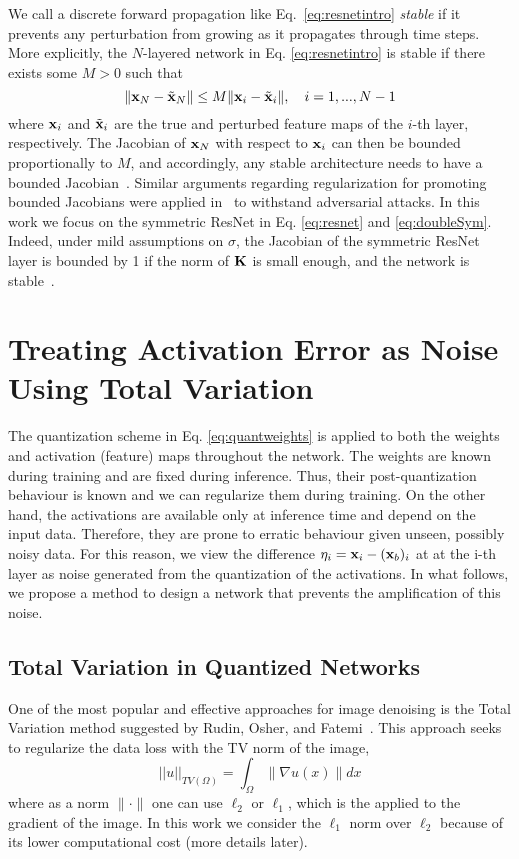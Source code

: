\documentclass[reqno]{amsart}
\newcommand{\bfx}{ {\bf x}}
\newcommand{\bfK}{{\bf K}}
\begin{document}
We call a discrete forward propagation like Eq.~\eqref{eq:resnetintro} \textit{stable} if it prevents any perturbation from growing as it propagates through time steps. More explicitly, the $N$-layered network in Eq. \eqref{eq:resnetintro} is stable if there exists some $M>0$ such that
$$
\|\bfx_N-\tilde\bfx_N\| \leq M \|\bfx_i-\tilde\bfx_i\|, \quad i=1,...,N-1
$$
where $\bfx_i$ and $\tilde\bfx_i$ are the true and perturbed feature maps of the $i$-th layer, respectively. The Jacobian of $\bfx_N$ with respect to $\bfx_i$ can then be bounded proportionally to $M$, and accordingly, any stable architecture needs to have a bounded Jacobian~\cite{ruthotto2019deep}. Similar arguments regarding regularization for promoting bounded Jacobians were applied in~\cite{jakubovitz2018improving} to withstand adversarial attacks. In this work we focus on the symmetric ResNet in Eq. \eqref{eq:resnet} and \eqref{eq:doubleSym}. Indeed, under mild assumptions on $\sigma$, the Jacobian of the symmetric ResNet layer is bounded by 1 if the norm of $\bfK$ is small enough, and the network is stable~\cite{ruthotto2019deep}.  

\section{Treating Activation Error as Noise Using Total Variation}
\label{sec:tv_cnn}
The quantization scheme in Eq. \eqref{eq:quantweights} is applied to both the weights and activation (feature) maps throughout the network. The weights are known during training and are fixed during inference. Thus, their post-quantization behaviour is known and we can regularize them during training. On the other hand, the activations are available only at inference time and depend on the input data. Therefore, they are prone to erratic behaviour given unseen, possibly noisy data. For this reason, we view the difference $\eta_i = \bfx_i - (\bfx_b)_i$ at at the i-th layer  as noise generated from the quantization of the activations. In what follows, we propose a method to design a network that prevents the amplification of this noise.
    
\subsection{\textbf{Total Variation in Quantized Networks}}
One of the most popular and effective approaches for image denoising is the Total Variation method suggested by Rudin, Osher, and Fatemi~\cite{RudinOsherFatemi1992}. This approach seeks to regularize the data loss with the TV norm of the image, 
\begin{equation}\label{eq:TV}
||u||_{TV(\Omega)}  = \int_{\Omega}{\|\nabla u(x)\| dx} 
\end{equation}
where as a norm $\|\cdot\|$ one can use $\ell_2$ or $\ell_1$, which is the applied to the gradient of the image. In this work we consider the $\ell_1$ norm over $\ell_2$ because of its lower computational cost (more details later).
\end{document}
